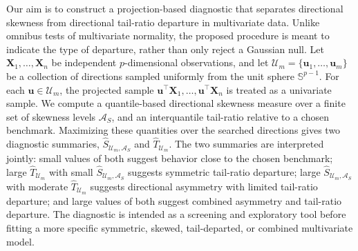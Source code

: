 \documentclass[11pt]{article}
\theoremstyle{plain}
\theoremstyle{definition}
\theoremstyle{remark}
\begin{document}
Our aim is to construct a projection-based diagnostic that separates directional skewness from directional tail-ratio departure in multivariate data. Unlike omnibus tests of multivariate normality, the proposed procedure is meant to indicate the type of departure, rather than only reject a Gaussian null. Let \(\bm X_1,\ldots,\bm X_n\) be independent \(p\)-dimensional observations, and let \(\mathcal{U}_{m}=\{\bm u_{1},\hdots, \bm u_{m}\}\) be a collection of directions sampled uniformly from the unit sphere $\mathbb{S}^{p-1}$. For each \(\bm u\in\mathcal U_m\), the projected sample \(\bm u^\top\bm X_1,\ldots,\bm u^\top\bm X_n\) is treated as a univariate sample. We compute a quantile-based directional skewness measure over a finite set of skewness levels \(\mathcal A_S\), and an interquantile tail-ratio relative to a chosen benchmark. Maximizing these quantities over the searched directions gives two diagnostic summaries, \(\widehat S_{\mathcal U_m,\mathcal A_S}\) and \(\widehat T_{\mathcal U_m}\). The two summaries are interpreted jointly: small values of both suggest behavior close to the chosen benchmark; large \(\widehat T_{\mathcal U_m}\) with small \(\widehat S_{\mathcal U_m,\mathcal A_S}\) suggests symmetric tail-ratio departure; large \(\widehat S_{\mathcal U_m,\mathcal A_S}\) with moderate \(\widehat T_{\mathcal U_m}\) suggests directional asymmetry with limited tail-ratio departure; and large values of both suggest combined asymmetry and tail-ratio departure. The diagnostic is intended as a screening and exploratory tool before fitting a more specific symmetric, skewed, tail-departed, or combined multivariate model.
\end{document}
